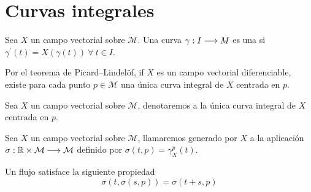 \section{Curvas integrales}\label{sec:curvas-integrales}
\begin{definition}
	Sea $X$ un campo vectorial sobre $\mathcal{M}$.
	Una curva $\gamma:I\longrightarrow M$ es una  si $\gamma^{'}(t)=X(\gamma
	(t))\
	\forall\
	t\in I$.
\end{definition}

Por el teorema de Picard–Lindelöf, if $X$ es un campo vectorial diferenciable, existe para cada punto $p\in\mathcal{M}$ una
única curva integral de $X$ centrada en $p$.

\begin{notation}
	Sea $X$ un campo vectorial sobre $\mathcal{M}$, denotaremos  a la única curva integral de $X$ centrada en $p$.
\end{notation}

\begin{definition}
  Sea $X$ un campo vectorial sobre $\mathcal{M}$, llamaremos  generado por $X$ a la aplicación
  $\sigma:\mathbb{R}\times\mathcal{M}\longrightarrow \mathcal{M}$ definido por $\sigma(t, p)=\gamma_X^p(t)$.
\end{definition}

Un flujo satisface la siguiente propiedad
\begin{equation*}
	\sigma(t, \sigma(s,p))=\sigma(t+s,p)
\end{equation*}